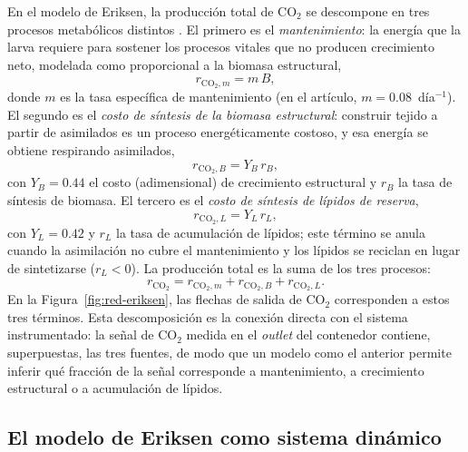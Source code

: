 En el modelo de Eriksen, la producción total de CO$_2$ se descompone en tres
procesos metabólicos distintos \citep{eriksenDynamicModellingFeed2022}. El primero es el
\emph{mantenimiento}: la energía que la larva requiere para sostener los
procesos vitales que no producen crecimiento neto, modelada como proporcional
a la biomasa estructural,
\begin{equation}
r_{\mathrm{CO_2},m} = m\,B,
\label{eq:rco2m}
\end{equation}
donde $m$ es la tasa específica de mantenimiento (en el artículo,
$m = 0.08$~día$^{-1}$). El segundo es el \emph{costo de síntesis de la
biomasa estructural}: construir tejido a partir de asimilados es un proceso
energéticamente costoso, y esa energía se obtiene respirando asimilados,
\begin{equation}
r_{\mathrm{CO_2},B} = Y_B\,r_B,
\label{eq:rco2b}
\end{equation}
con $Y_B = 0.44$ el costo (adimensional) de crecimiento estructural y $r_B$
la tasa de síntesis de biomasa. El tercero es el \emph{costo de síntesis de
lípidos de reserva},
\begin{equation}
r_{\mathrm{CO_2},L} = Y_L\,r_L,
\label{eq:rco2l}
\end{equation}
con $Y_L = 0.42$ y $r_L$ la tasa de acumulación de lípidos; este término se
anula cuando la asimilación no cubre el mantenimiento y los lípidos se
reciclan en lugar de sintetizarse ($r_L < 0$). La producción total es la suma
de los tres procesos:
\begin{equation}
r_{\mathrm{CO_2}} = r_{\mathrm{CO_2},m} + r_{\mathrm{CO_2},B} + r_{\mathrm{CO_2},L}.
\label{eq:rco2total}
\end{equation}
En la Figura~\ref{fig:red-eriksen}, las flechas de salida de CO$_2$
corresponden a estos tres términos. Esta descomposición es la conexión directa
con el sistema instrumentado: la señal de CO$_2$ medida en el \emph{outlet}
del contenedor contiene, superpuestas, las tres fuentes, de modo que un modelo
como el anterior permite inferir qué fracción de la señal corresponde a
mantenimiento, a crecimiento estructural o a acumulación de lípidos.

\subsection{El modelo de Eriksen como sistema dinámico}

